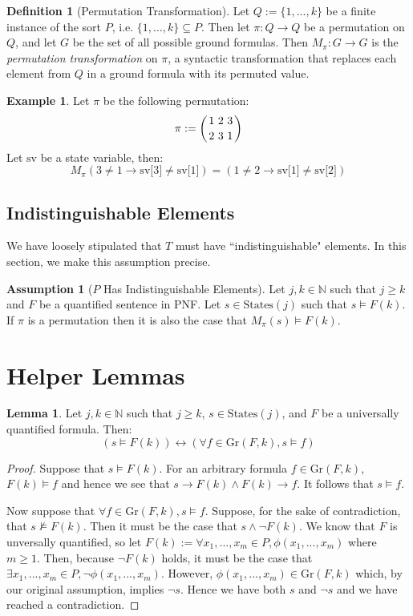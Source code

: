 \documentclass[12pt]{article}
\theoremstyle{definition}
\newtheorem{assumption}{Assumption}
\newtheorem{lemma}{Lemma}
\newtheorem{definition}{Definition}
\newtheorem{example}{Example}
\theoremstyle{remark}
\newcommand{\msp}{\text{ }}
\newcommand{\states}{\text{States}}
\newcommand{\gr}{\text{Gr}}
\newcommand{\perm}{\genfrac{}{}{0pt}{}}
\begin{document}
\begin{definition}[Permutation Transformation]
  Let $Q := \{1,...,k\}$ be a finite instance of the sort $P$, i.e. $\{1,...,k\} \subseteq P$.  Then let $\pi : Q \to Q$ be a permutation on $Q$, and let $G$ be the set of all possible ground formulas.  Then $M_\pi : G \to G$ is the \textit{permutation transformation} on $\pi$, a syntactic transformation that replaces each element from $Q$ in a ground formula with its permuted value.
\end{definition}

\begin{example}
  Let $\pi$ be the following permutation:
  $$\pi := \left( \perm{1 \msp 2 \msp 3}{2 \msp 3 \msp 1} \right)$$
  Let $\text{sv}$ be a state variable, then:
  $$M_\pi(3 \neq 1 \rightarrow \text{sv[3]} \neq \text{sv[1]}) = (1 \neq 2 \rightarrow \text{sv[1]} \neq \text{sv[2]})$$
\end{example}

\subsection{Indistinguishable Elements}
We have loosely stipulated that $T$ must have ``indistinguishable" elements.  In this section, we make this assumption precise.

\begin{assumption}[$P$ Has Indistinguishable Elements]
  \label{asmp:indist}
  Let $j,k \in \mathbb{N}$ such that $j \geq k$ and $F$ be a quantified sentence in PNF.  Let $s \in \states(j)$ such that $s \models F(k)$.  If $\pi$ is a permutation then it is also the case that $M_\pi(s) \models F(k)$.
\end{assumption}



\section{Helper Lemmas}

\begin{lemma}
  \label{lem:pnf-ground}
  Let $j,k \in \mathbb{N}$ such that $j \geq k$, $s \in \states(j)$, and $F$ be a universally quantified formula.  Then:
  $$(s \models F(k)) \leftrightarrow (\forall f \in \gr(F,k), s \models f)$$
\end{lemma}
\begin{proof}
  Suppose that $s \models F(k)$.  For an arbitrary formula $f \in \gr(F,k)$, $F(k) \models f$ and hence we see that $s \rightarrow F(k) \land F(k) \rightarrow f$.  It follows that $s \models f$.

  Now suppose that $\forall f \in \gr(F,k), s \models f$.  Suppose, for the sake of contradiction, that $s \not\models F(k)$.  Then it must be the case that $s \land \neg F(k)$.  We know that $F$ is unversally quantified, so let $F(k) := \forall x_1,...,x_m \in P, \phi(x_1,...,x_m)$ where $m \geq 1$.  Then, because $\neg F(k)$ holds, it must be the case that $\exists x_1,...,x_m \in P, \neg \phi(x_1,...,x_m)$.  However, $\phi(x_1,...,x_m) \in \gr(F,k)$ which, by our original assumption, implies $\neg s$.  Hence we have both $s$ and $\neg s$ and we have reached a contradiction.
\end{proof}
\end{document}
